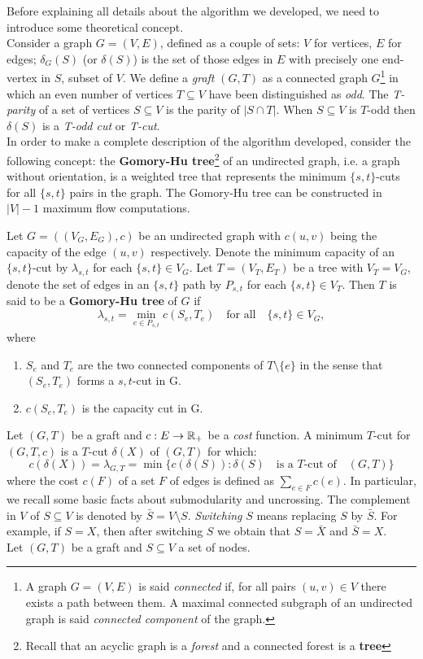 Before explaining all details about the algorithm we developed, we need to introduce some theoretical concept. \\

Consider a graph $G = (V, E)$, defined as a couple of sets: $V$ for vertices, $E$ for edges; $\delta_{G}(S)$ (or $\delta(S)$) is the set of those edges in $E$ with precisely one end-vertex in $S$, subset of $V$. We define a \emph{graft} $(G,T)$ as a connected graph $G$\footnote{A graph $G = (V,E)$ is said \emph{connected} if, for all pairs $(u,v) \in V$ there exists a path between them. A maximal connected subgraph of an undirected graph is said \emph{connected component} of the graph.} in which an even number of vertices $T \subseteq V$ have been distinguished as \emph{odd}. The \emph{T-parity} of a set of vertices $S \subseteq V$ is the parity of $|S \cap T|$. When $S \subseteq V$ is $T$-odd then $\delta(S)$ is a \emph{T-odd cut} or \emph{T-cut}. \\
  
 In order to make a complete description of the algorithm developed, consider the following concept: the \textbf{Gomory-Hu tree}\footnote{Recall that an acyclic graph is a \emph{forest} and a connected forest is a \textbf{tree}} of an undirected graph, i.e. a graph without orientation, is a weighted tree that represents the minimum $\{s,t\}$-cuts for all $\{s,t\}$ pairs in the graph. The Gomory-Hu tree can be constructed in $|V| - 1$ maximum flow computations.
 
 \begin{definition}
 Let $G = ((V_G, E_G), c)$ be an undirected graph with $c(u,v)$ being the capacity of the edge $(u,v)$ respectively. Denote the minimum capacity of an $\{s,t\}$-cut by $\lambda_{s,t}$ for each $\{s,t\} \in V_G$. Let $T = (V_T, E_T)$ be a tree with $V_T = V_G$, denote the set of edges in an $\{s,t\}$ path by $P_{s,t}$ for each $\{s,t\} \in V_T$. Then $T$ is said to be a \textbf{Gomory-Hu tree} of $G$ if
 \[
 \lambda_{s,t} = \min_{e \in P_{s,t}} c(S_e, T_e) \quad \text{for all} \quad \{s,t\} \in V_{G},
 \]
 where
 \begin{enumerate}
 \item $S_e$ and $T_e$ are the two connected components of $T \setminus \{e\}$ in the sense that $(S_e, T_e)$ forms a $s,t$-cut in G. \\
 \item $c(S_e, T_e)$ is the capacity cut in G.
 \end{enumerate}
 \end{definition}
Let $(G,T)$ be a graft and $c: E \to \mathbb{R}_+$ be a \emph{cost} function. A minimum $T$-cut for $(G,T,c)$ is a $T$-cut $\delta(X)$ of $(G,T)$ for which:
\[
c(\delta(X)) = \lambda_{G,T} = \min\{c(\delta(S)): \delta(S)\quad \text{is a $T$-cut of}\quad(G,T) \}
\]
where the cost $c(F)$ of a set $F$ of edges is defined as $\sum_{e \in F} c(e)$.
In particular, we recall some basic facts about submodularity and uncrossing. The complement in $V$ of $S \subseteq V$ is denoted by $\bar{S} = V \setminus S$. \emph{Switching} $S$ means replacing $S$ by $\bar{S}$. For example, if $S = X$, then after switching $S$ we obtain that $S = \bar{X}$ and $\bar{S} = X$. \\
Let $(G, T)$ be a graft and $S \subseteq V$ a set of nodes. 

